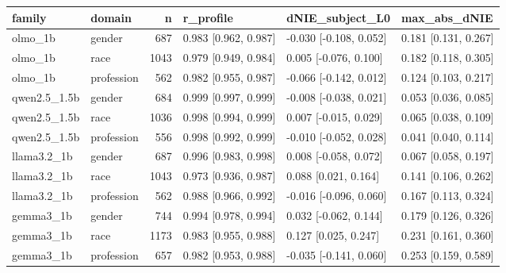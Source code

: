 \begin{tabular}{llrlll}
\toprule
family & domain & n & r_profile & dNIE_subject_L0 & max_abs_dNIE \\
\midrule
olmo_1b & gender & 687 & 0.983 [0.962, 0.987] & -0.030 [-0.108, 0.052] & 0.181 [0.131, 0.267] \\
olmo_1b & race & 1043 & 0.979 [0.949, 0.984] & 0.005 [-0.076, 0.100] & 0.182 [0.118, 0.305] \\
olmo_1b & profession & 562 & 0.982 [0.955, 0.987] & -0.066 [-0.142, 0.012] & 0.124 [0.103, 0.217] \\
qwen2.5_1.5b & gender & 684 & 0.999 [0.997, 0.999] & -0.008 [-0.038, 0.021] & 0.053 [0.036, 0.085] \\
qwen2.5_1.5b & race & 1036 & 0.998 [0.994, 0.999] & 0.007 [-0.015, 0.029] & 0.065 [0.038, 0.109] \\
qwen2.5_1.5b & profession & 556 & 0.998 [0.992, 0.999] & -0.010 [-0.052, 0.028] & 0.041 [0.040, 0.114] \\
llama3.2_1b & gender & 687 & 0.996 [0.983, 0.998] & 0.008 [-0.058, 0.072] & 0.067 [0.058, 0.197] \\
llama3.2_1b & race & 1043 & 0.973 [0.936, 0.987] & 0.088 [0.021, 0.164] & 0.141 [0.106, 0.262] \\
llama3.2_1b & profession & 562 & 0.988 [0.966, 0.992] & -0.016 [-0.096, 0.060] & 0.167 [0.113, 0.324] \\
gemma3_1b & gender & 744 & 0.994 [0.978, 0.994] & 0.032 [-0.062, 0.144] & 0.179 [0.126, 0.326] \\
gemma3_1b & race & 1173 & 0.983 [0.955, 0.988] & 0.127 [0.025, 0.247] & 0.231 [0.161, 0.360] \\
gemma3_1b & profession & 657 & 0.982 [0.953, 0.988] & -0.035 [-0.141, 0.060] & 0.253 [0.159, 0.589] \\
\bottomrule
\end{tabular}
